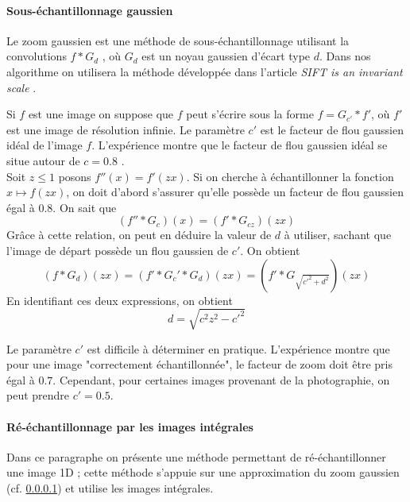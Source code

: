 \paragraph{Sous-échantillonnage gaussien}
\label{zoom_gaussien}
Le zoom gaussien est une méthode de sous-échantillonnage utilisant la convolutions $f*G_{d}$ , où $G_d$ est un noyau gaussien d'écart type $d$. Dans nos algorithme on utilisera la méthode développée dans l'article \emph{SIFT is an invariant scale} \cite{morel2011sift}.

Si $f$ est une image on suppose que $f$ peut s'écrire sous la forme $f=G_{c'} * f'$, où $f'$ est une image de résolution infinie. Le paramètre $c'$ est le facteur de flou gaussien idéal de l'image $f$. L'expérience montre que le facteur de flou gaussien idéal se situe autour de $c=0.8$ \cite{morel2011sift}.\\
Soit $z\le 1$ posons $f''(x)=f'(zx)$. Si on cherche à échantillonner la fonction  $x\mapsto f(zx)$,  on doit d'abord s'assurer qu'elle possède un facteur de flou gaussien égal à $0.8$. On sait que 
\begin{equation*}
(f''*G_{c})(x)=(f'*G_{cz})(zx)
\end{equation*}
Grâce à cette relation, on peut en déduire la valeur de $d$ à utiliser, sachant que l'image de départ possède un flou gaussien de $c'$. On obtient
\begin{equation*}
(f*G_d)(zx)=(f'*G_c'*G_d)(zx)=(f'*G_{\sqrt{c'^2 + d^2}})(zx)
\end{equation*}
En identifiant ces deux expressions, on obtient
\begin{equation}
d=\sqrt{c^2 z^2 - c'^2}
\label{formule_zoom_gaussien}
\end{equation}

Le paramètre $c'$ est difficile à déterminer en pratique. L'expérience montre que pour une image "correctement échantillonnée", le facteur de zoom doit être pris égal à $0.7$. Cependant, pour certaines images provenant de la photographie, on peut prendre $c'=0.5$.

\paragraph{Ré-échantillonnage par les images intégrales}
\label{4Integral}
Dans ce paragraphe on présente une méthode permettant de ré-échantillonner une image 1D ; cette méthode s'appuie sur une approximation du zoom gaussien (cf. \ref{zoom_gaussien}) et utilise les images intégrales.

